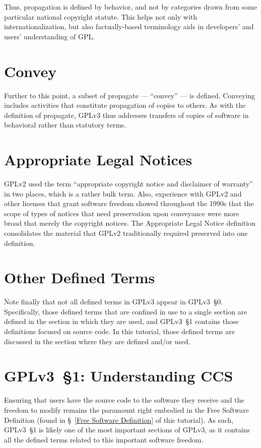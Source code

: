 Thus, propagation is defined by behavior, and not by categories drawn from
some particular national copyright statute.  This helps not only with
internationalization, but also factually-based terminology aids in
developers' and users' understanding of GPL\@.

\section{Convey}

Further to this point, a subset of propagate --- ``convey'' --- is defined.
Conveying includes activities that constitute propagation of copies to
others.  As with the definition of propagate, GPLv3 thus addresses transfers
of copies of software in behavioral rather than statutory terms.  

\section{Appropriate Legal Notices}

GPLv2 used the term ``appropriate copyright notice and disclaimer of
warranty'' in two places, which is a rather bulk term.  Also, experience with
GPLv2 and other licenses that grant software freedom showed throughout the
1990s that the scope of types of notices that need preservation upon
conveyance were more broad that merely the copyright notices.  The
Appropriate Legal Notice definition consolidates the material that GPLv2
traditionally required preserved into one definition.

\section{Other Defined Terms}

Note finally that not all defined terms in GPLv3 appear in GPLv3~\S0.
Specifically, those defined terms that are confined in use to a single
section are defined in the section in which they are used, and GPLv3~\S1
contains those definitions focused on source code.  In this tutorial, those
defined terms are discussed in the section where they are defined and/or
used.

\section{GPLv3~\S1: Understanding CCS}

Ensuring that users have the source code to the software they receive and the
freedom to modify remains the paramount right embodied in the Free Software
Definition (found in \S~\ref{Free Software Definition} of this tutorial).  As
such, GPLv3~\S1 is likely one of the most important sections of GPLv3, as it
contains all the defined terms related to this important software freedom.

